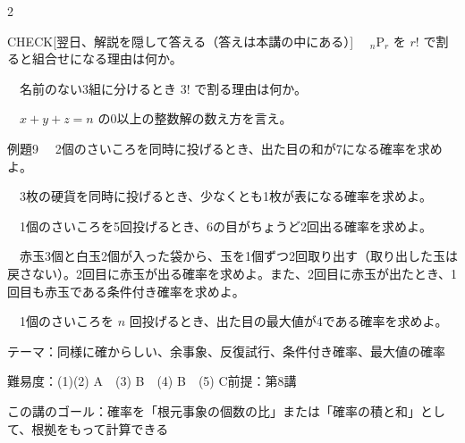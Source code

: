 \documentclass[paper=b5j, fontsize=8pt, fleqn, twoside]{jlreq}
\begin{document}
\begin{multicols*}{2}
  \begin{ptbs}{CHECK}[翌日、解説を隠して答える（答えは本講の中にある）]
    　${}_n\mathrm P_r$ を $r!$ で割ると組合せになる理由は何か。\par
    　名前のない3組に分けるとき $3!$ で割る理由は何か。\par
    　$x+y+z=n$ の0以上の整数解の数え方を言え。
  \end{ptbs}

  \notefill
\end{multicols*}

\begin{ascolorbox4A}[出典：オリジナル]{例題9}
  　2個のさいころを同時に投げるとき、出た目の和が7になる確率を求めよ。\par
  　3枚の硬貨を同時に投げるとき、少なくとも1枚が表になる確率を求めよ。\par
  　1個のさいころを5回投げるとき、6の目がちょうど2回出る確率を求めよ。\par
  　赤玉3個と白玉2個が入った袋から、玉を1個ずつ2回取り出す（取り出した玉は戻さない）。2回目に赤玉が出る確率を求めよ。また、2回目に赤玉が出たとき、1回目も赤玉である条件付き確率を求めよ。\par
  　1個のさいころを $n$ 回投げるとき、出た目の最大値が4である確率を求めよ。
\end{ascolorbox4A}

\begin{Data}
  テーマ：同様に確からしい、余事象、反復試行、条件付き確率、最大値の確率\par
  難易度：(1)(2) A　(3) B　(4) B　(5) C\quad 前提：第8講\par
  この講のゴール：確率を「根元事象の個数の比」または「確率の積と和」として、根拠をもって計算できる
\end{Data}
\end{document}
